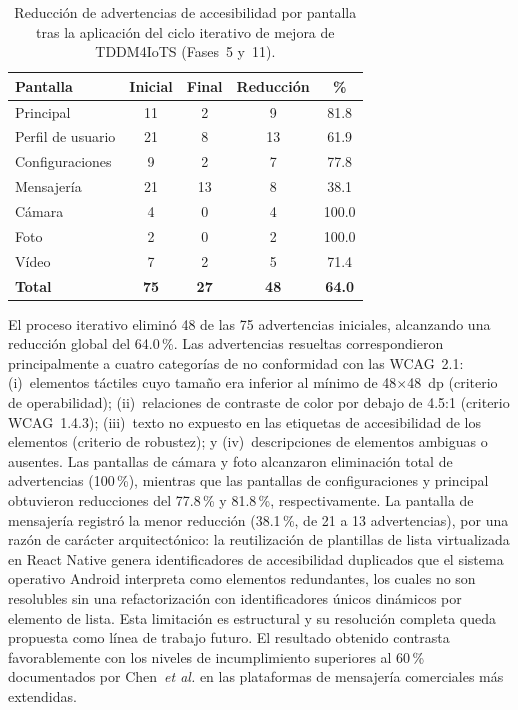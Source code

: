 \documentclass[journal]{IEEEtran}
\begin{document}
	\begin{table}[!t]
		\caption{Reducci\'on de advertencias de accesibilidad por pantalla tras la aplicaci\'on del ciclo iterativo de mejora de TDDM4IoTS (Fases~5 y~11).}
		\label{tab:accesibilidad}
		\centering
		\renewcommand{\arraystretch}{1.25}
		\begin{tabular}{lcccc}
			\toprule
			\textbf{Pantalla} & \textbf{Inicial} & \textbf{Final} & \textbf{Reducci\'on} & \textbf{\%} \\
			\midrule
			Principal         & 11 & 2  & 9  & 81.8 \\
			Perfil de usuario & 21 & 8  & 13 & 61.9 \\
			Configuraciones   & 9  & 2  & 7  & 77.8 \\
			Mensajer\'ia      & 21 & 13 & 8  & 38.1 \\
			C\'amara          & 4  & 0  & 4  & 100.0 \\
			Foto              & 2  & 0  & 2  & 100.0 \\
			V\'ideo           & 7  & 2  & 5  & 71.4 \\
			\midrule
			\textbf{Total}    & \textbf{75} & \textbf{27} & \textbf{48} & \textbf{64.0} \\
			\bottomrule
		\end{tabular}
	\end{table}
	
	El proceso iterativo elimin\'o 48 de las 75 advertencias iniciales, alcanzando una reducci\'on global del 64.0\,\%. Las advertencias resueltas correspondieron principalmente a cuatro categor\'ias de no conformidad con las WCAG~2.1: (i)~elementos t\'actiles cuyo tama\~no era inferior al m\'inimo de 48$\times$48~dp (criterio de operabilidad); (ii)~relaciones de contraste de color por debajo de 4.5:1 (criterio WCAG~1.4.3); (iii)~texto no expuesto en las etiquetas de accesibilidad de los elementos (criterio de robustez); y (iv)~descripciones de elementos ambiguas o ausentes. Las pantallas de c\'amara y foto alcanzaron eliminaci\'on total de advertencias (100\,\%), mientras que las pantallas de configuraciones y principal obtuvieron reducciones del 77.8\,\% y 81.8\,\%, respectivamente. La pantalla de mensajer\'ia registr\'o la menor reducci\'on (38.1\,\%, de 21 a 13 advertencias), por una raz\'on de car\'acter arquitect\'onico: la reutilizaci\'on de plantillas de lista virtualizada en React Native genera identificadores de accesibilidad duplicados que el sistema operativo Android interpreta como elementos redundantes, los cuales no son resolubles sin una refactorizaci\'on con identificadores \'unicos din\'amicos por elemento de lista. Esta limitaci\'on es estructural y su resoluci\'on completa queda propuesta como l\'inea de trabajo futuro. El resultado obtenido contrasta favorablemente con los niveles de incumplimiento superiores al 60\,\% documentados por Chen~\textit{et al.} \cite{chen2022} en las plataformas de mensajer\'ia comerciales m\'as extendidas.
	
\end{document}
